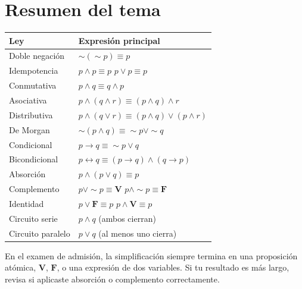 \section{Resumen del tema}

\begin{cajaformula}
  \begin{center}
  \renewcommand{\arraystretch}{1.5}
  \begin{tabular}{@{}ll@{}}
    \toprule
    \rowcolor{AzulClaro!60}
    \textbf{Ley} & \textbf{Expresi\'{o}n principal} \\
    \midrule
    Doble negaci\'{o}n  & $\sim(\sim p) \equiv p$ \\
    Idempotencia        & $p \wedge p \equiv p$ \quad $p \vee p \equiv p$ \\
    Conmutativa         & $p \wedge q \equiv q \wedge p$ \\
    Asociativa          & $p \wedge(q \wedge r)\equiv(p \wedge q)\wedge r$ \\
    Distributiva        & $p \wedge(q \vee r)\equiv(p \wedge q)\vee(p \wedge r)$ \\
    De Morgan           & $\sim(p \wedge q)\equiv \sim p \vee \sim q$ \\
    Condicional         & $p \rightarrow q \equiv \sim p \vee q$ \\
    Bicondicional       & $p \leftrightarrow q \equiv (p \to q)\wedge(q \to p)$ \\
    Absorci\'{o}n       & $p \wedge(p \vee q)\equiv p$ \\
    Complemento         & $p \vee \sim p \equiv \mathbf{V}$ \quad $p \wedge \sim p \equiv \mathbf{F}$ \\
    Identidad           & $p \vee \mathbf{F}\equiv p$ \quad $p \wedge \mathbf{V}\equiv p$ \\
    \midrule
    Circuito serie      & $p \wedge q$ (ambos cierran) \\
    Circuito paralelo   & $p \vee q$ (al menos uno cierra) \\
    \bottomrule
  \end{tabular}
  \end{center}
\end{cajaformula}

\begin{cajatip}
  En el examen de admisión, la simplificación siempre termina en una
  proposición atómica, $\mathbf{V}$, $\mathbf{F}$, o una expresión de
  dos variables. Si tu resultado es más largo, revisa si aplicaste
  absorción o complemento correctamente.
\end{cajatip}

